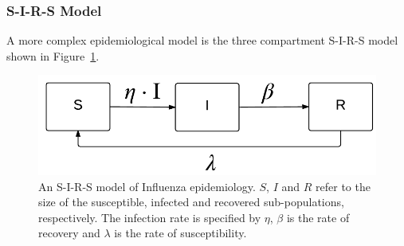 \subsubsection{S-I-R-S Model}
\label{sec:results_influenza_sirs}

A more complex epidemiological model is the three compartment S-I-R-S model shown in Figure~\ref{fig:sirs_spec}.
\begin{figure}[h!]
    \centering
    \includegraphics[width=0.5\linewidth, height=0.16\linewidth]{images/sirs}
    \caption{An S-I-R-S model of Influenza epidemiology.  {\footnotesize $ S $}, {\footnotesize $ I $} and {\footnotesize $ R $} refer to the size of the susceptible, infected and recovered sub-populations, respectively. The infection rate is specified by {\footnotesize $ \eta$}, {\footnotesize $\beta$} is the rate of recovery and {\footnotesize $\lambda$} is the rate of susceptibility.}
    \label{fig:sirs_spec}            
\end{figure}


